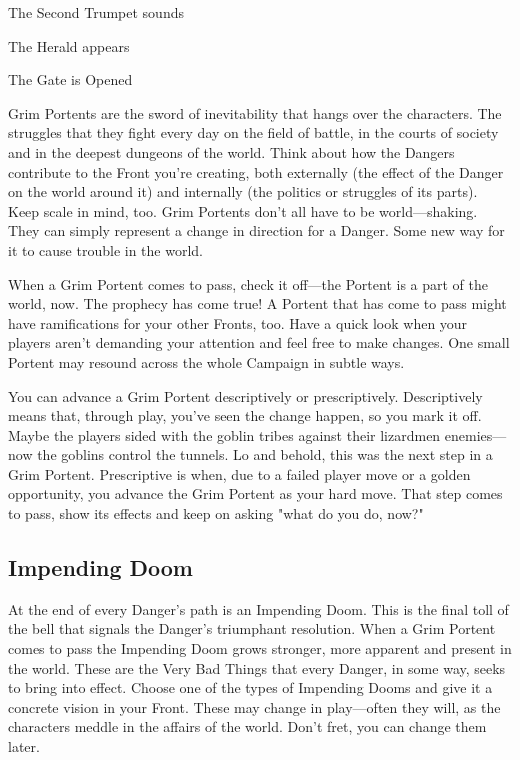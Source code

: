  
\item The Second Trumpet sounds

 
\item The Herald appears

 
\item The Gate is Opened


\stopitemize

\stopExample
 

Grim Portents are the sword of inevitability that hangs over the characters. The struggles that they fight every day on the field of battle, in the courts of society and in the deepest dungeons of the world. Think about how the Dangers contribute to the Front you're creating, both externally (the effect of the Danger on the world around it) and internally (the politics or struggles of its parts). Keep scale in mind, too. Grim Portents don’t all have to be world—shaking. They can simply represent a change in direction for a Danger. Some new way for it to cause trouble in the world.

 

When a Grim Portent comes to pass, check it off—the Portent is a part of the world, now. The prophecy has come true! A Portent that has come to pass might have ramifications for your other Fronts, too. Have a quick look when your players aren’t demanding your attention and feel free to make changes. One small Portent may resound across the whole Campaign in subtle ways.

 

You can advance a Grim Portent descriptively or prescriptively. Descriptively means that, through play, you've seen the change happen, so you mark it off. Maybe the players sided with the goblin tribes against their lizardmen enemies—now the goblins control the tunnels. Lo and behold, this was the next step in a Grim Portent. Prescriptive is when, due to a failed player move or a golden opportunity, you advance the Grim Portent as your hard move. That step comes to pass, show its effects and keep on asking "what do you do, now?"

 
\subsection{Impending Doom}   
 

At the end of every Danger's path is an Impending Doom. This is the final toll of the bell that signals the Danger’s triumphant resolution. When a Grim Portent comes to pass the Impending Doom grows stronger, more apparent and present in the world. These are the Very Bad Things that every Danger, in some way, seeks to bring into effect. Choose one of the types of Impending Dooms and give it a concrete vision in your Front. These may change in play—often they will, as the characters meddle in the affairs of the world. Don't fret, you can change them later.


